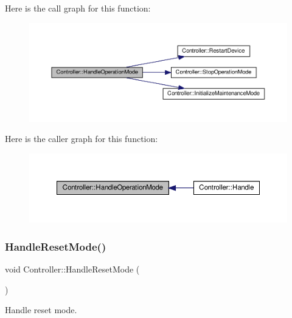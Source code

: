 Here is the call graph for this function\+:
\nopagebreak
\begin{figure}[H]
\begin{center}
\leavevmode
\includegraphics[width=350pt]{classController_a431dc67f69757e96cfc9b42454c71097_cgraph}
\end{center}
\end{figure}
Here is the caller graph for this function\+:
\nopagebreak
\begin{figure}[H]
\begin{center}
\leavevmode
\includegraphics[width=350pt]{classController_a431dc67f69757e96cfc9b42454c71097_icgraph}
\end{center}
\end{figure}
\mbox{\label{classController_ae512c48c1ebafb35c90948835361cf0c}} 
\subsubsection{\texorpdfstring{Handle\+Reset\+Mode()}{HandleResetMode()}}
{\footnotesize\ttfamily void Controller\+::\+Handle\+Reset\+Mode (\begin{DoxyParamCaption}{ }\end{DoxyParamCaption})\hspace{0.3cm}{\ttfamily [private]}}



Handle reset mode. 


